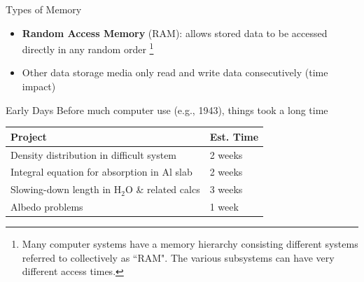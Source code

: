 \documentclass[xcolor=x11names,compress]{beamer}
\renewcommand{\(}{\begin{columns}}
\renewcommand{\)}{\end{columns}}
\newcommand{\<}[1]{\begin{column}{#1}}
\renewcommand{\>}{\end{column}}
\begin{document}
\begin{frame}{Types of Memory}
\begin{itemize}
\item \textbf{Random Access Memory} (RAM): allows stored data to be accessed directly in any random order \footnote{Many computer systems have a memory hierarchy consisting different systems referred to collectively as ``RAM". The various subsystems can have very different access times.}
\item Other data storage media only read and write data consecutively (time impact)
\end{itemize}
\end{frame}

\begin{frame}{Early Days}
Before much computer use (e.g., 1943), things took a long time
\begin{tabu}{|X | l|}
\hline
Project & Est. Time \\\hline
Density distribution in difficult system & 2 weeks \\
Integral equation for absorption in Al slab & 2 weeks \\
Slowing-down length in H$_2$O \& related calcs & 3 weeks \\
Albedo problems & 1 week \\\hline
\end{tabu}
\begin{center}
\end{center}
\end{frame}
\end{document}
